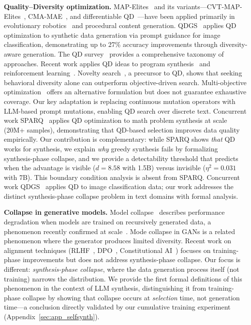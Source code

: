 \documentclass{article}
\begin{document}
\begin{enumerate}[nosep]
\textbf{Quality--Diversity optimization.}
MAP-Elites~\citep{mouret_2015} and its variants---CVT-MAP-Elites~\citep{fontaine_2020}, CMA-MAE~\citep{cma_mae_2022}, and differentiable QD~\citep{fontaine_2021}---have been applied primarily in evolutionary robotics~\citep{qd_robotics_2020} and procedural content generation.
QDGS~\citep{um2024qdgs} applies QD optimization to synthetic data generation via prompt guidance for image classification, demonstrating up to 27\% accuracy improvements through diversity-aware generation.
The QD survey~\citep{diversity_quality_2023} provides a comprehensive taxonomy of approaches.
Recent work applies QD ideas to program synthesis~\citep{dsge_2018} and reinforcement learning~\citep{deep_rl_qd_2021}.
Novelty search~\citep{novelty_search_2011}, a precursor to QD, shows that seeking behavioral diversity alone can outperform objective-driven search.
Multi-objective optimization~\citep{nsga_ii_2002} offers an alternative formulation but does not guarantee exhaustive coverage.
Our key adaptation is replacing continuous mutation operators with LLM-based prompt mutations, enabling QD search over discrete text.
Concurrent work SPARQ~\citep{sparq_2025} applies QD optimization to math problem synthesis at scale (20M+ samples), demonstrating that QD-based selection improves data quality empirically. Our contribution is complementary: while SPARQ shows \emph{that} QD works for synthesis, we explain \emph{why} greedy synthesis fails by formalizing synthesis-phase collapse, and we provide a detectability threshold that predicts when the advantage is visible ($d{=}8.58$ with 1.5B) versus invisible ($\eta^2{=}0.031$ with 7B). This boundary condition analysis is absent from SPARQ.
Concurrent work QDGS~\citep{um2024qdgs} applies QD to image classification data; our work addresses the distinct synthesis-phase collapse problem in text domains with formal analysis.

\textbf{Collapse in generative models.}
Model collapse~\citep{model_collapse_2023} describes performance degradation when models are trained on recursively generated data, a phenomenon recently confirmed at scale~\citep{data_collapse_2024}.
Mode collapse in GANs is a related phenomenon where the generator produces limited diversity.
Recent work on alignment techniques (RLHF~\citep{ouyang2022training}, DPO~\citep{rafailov2023dpo}, Constitutional AI~\citep{bai2022constitutional}) focuses on training-phase improvements but does not address synthesis-phase collapse.
Our focus is different: \emph{synthesis-phase collapse}, where the data generation process itself (not training) narrows the distribution.
We provide the first formal definitions of this phenomenon in the context of LLM synthesis, distinguishing it from training-phase collapse by showing that collapse occurs at \emph{selection} time, not generation time---a conclusion directly validated by our cumulative training experiment (Appendix~\ref{sec:app_selfsynth}).


\end{enumerate}
\end{document}
